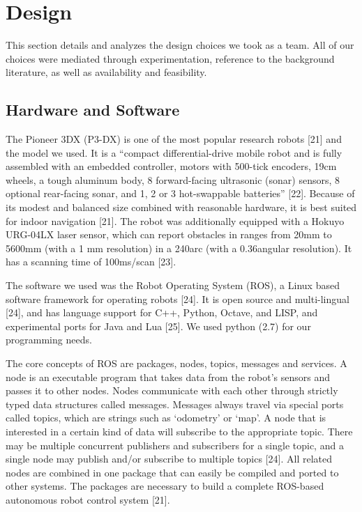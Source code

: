 \documentclass{article}
\begin{document}
    \section{Design}
This section details and analyzes the design choices we took as a team. All of our choices were mediated through experimentation, reference to the background literature, as well as availability and feasibility.

	\subsection{Hardware and Software}    
    The Pioneer 3DX (P3-DX) is one of the most popular research robots [21] and the model we used.  It is a “compact differential-drive mobile robot and is fully assembled with an embedded controller, motors with 500-tick encoders, 19cm wheels, a tough aluminum body, 8 forward-facing ultrasonic (sonar) sensors, 8 optional rear-facing sonar, and 1, 2 or 3 hot-swappable batteries” [22].  Because of its modest and balanced size combined with reasonable hardware, it is best suited for indoor navigation [21]. The robot was additionally equipped with a Hokuyo URG-04LX laser sensor, which can report obstacles in ranges from 20mm to 5600mm (with a 1 mm resolution) in a 240\degree arc (with a 0.36\degree angular resolution). It has a scanning time of 100ms/scan [23]. 

The software we used was the Robot Operating System (ROS),  a Linux based software framework for operating robots [24]. It is open source and multi-lingual [24], and has language support for  C++, Python, Octave, and LISP, and experimental ports for Java and Lua [25]. We used python (2.7) for our programming needs.

The core concepts of ROS are packages, nodes, topics, messages and services. A node is an executable program that takes data from the robot's sensors and passes it to other nodes. Nodes communicate with each other through strictly typed data structures called messages. Messages always travel via special ports called topics, which are strings such as ‘odometry’ or ‘map’. A node that is interested in a certain kind of data will subscribe to the appropriate topic. There may be multiple concurrent publishers and subscribers for a single topic, and a single node may publish and/or subscribe to multiple topics [24]. All related nodes are combined in one package that can easily be compiled and ported to other systems. The packages are necessary to build a complete ROS-based autonomous robot control system [21].
\end{document}
